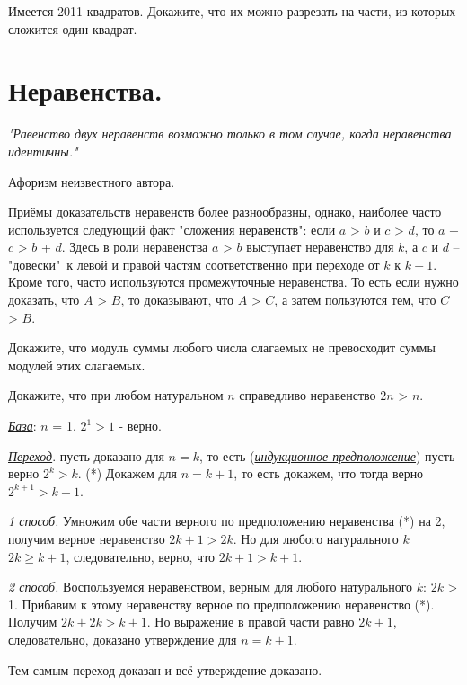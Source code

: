 \begin{thm}
    Имеется 2011 квадратов. Докажите, что их можно разрезать на части, из которых сложится один квадрат.
\end{thm}

\section{Неравенства.}
\epigraph{\textit{"Равенство двух неравенств возможно только в том случае, когда неравенства идентичны."}}{Афоризм неизвестного автора.}

Приёмы доказательств неравенств более разнообразны, однако, наиболее часто используется следующий факт "сложения неравенств": если $a$ > $b$ и $c$ > $d$, то $a$ + $c$ > $b$ + $d$. Здесь в роли неравенства $a$ > $b$ выступает неравенство для $k$, а $c$ и $d$ – "довески"~к левой и правой частям соответственно при переходе от $k$ к $k + 1$. Кроме того, часто используются промежуточные неравенства. То есть если нужно доказать, что $A$ > $B$, то доказывают, что $A$ > $C$, а затем пользуются тем, что $C$ > $B$.

\begin{thm}
Докажите, что модуль суммы любого числа слагаемых не превосходит суммы модулей этих слагаемых.
\end{thm}

\begin{thm}
Докажите, что при любом натуральном $n$ справедливо неравенство $2n$ > $n$.
\end{thm}

\begin{prf}
\par
\textit{\underline{База}}: $n$ = 1. $2^1 > 1$ - верно.
\par
\textit{\underline{Переход}}. пусть доказано для $n = k$, то есть (\textit{\underline{индукционное предположение}}) пусть верно $2^k > k$. (*) Докажем для $n = k + 1$, то есть докажем, что тогда верно $2^{k+1} > k + 1$.
\par
\textit{1 способ.} Умножим обе части верного по предположению неравенства (*) на 2, получим верное неравенство $2k+1 > 2k$. Но для любого натурального $k$ $2k \geq k + 1$, следовательно, верно, что  $2k + 1 > k + 1$.
\par
\textit{2 способ.} Воспользуемся неравенством, верным для любого натурального $k$: $2k$ > 1. Прибавим к этому неравенству верное по предположению неравенство (*). Получим $2k + 2k > k + 1$. Но выражение в правой части равно $2k + 1$, следовательно, доказано утверждение для $n = k + 1$.
\par
Тем самым переход доказан и всё утверждение доказано. 
\end{prf}

